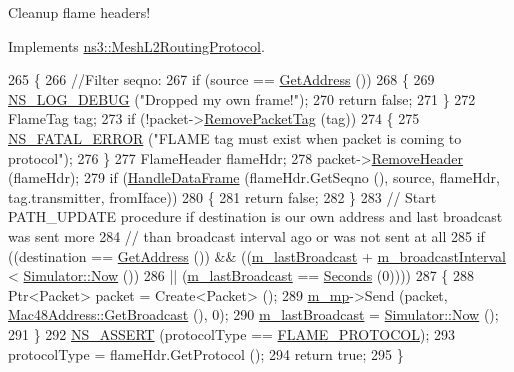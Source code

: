 Cleanup flame headers! 



Implements \hyperlink{classns3_1_1MeshL2RoutingProtocol_ae110ac0c9b8f81cb2a05940b385e7f08}{ns3\+::\+Mesh\+L2\+Routing\+Protocol}.


\begin{DoxyCode}
265 \{
266   \textcolor{comment}{//Filter seqno:}
267   \textcolor{keywordflow}{if} (source == \hyperlink{classns3_1_1flame_1_1FlameProtocol_a837bba2752ab7f2edfb4fc0488656c0a}{GetAddress} ())
268     \{
269       \hyperlink{group__logging_ga413f1886406d49f59a6a0a89b77b4d0a}{NS\_LOG\_DEBUG} (\textcolor{stringliteral}{"Dropped my own frame!"});
270       \textcolor{keywordflow}{return} \textcolor{keyword}{false};
271     \}
272   FlameTag tag;
273   \textcolor{keywordflow}{if} (!packet->\hyperlink{classns3_1_1Packet_a078fe922d976a417ab25ba2f3c2fd667}{RemovePacketTag} (tag))
274     \{
275       \hyperlink{group__fatal_ga5131d5e3f75d7d4cbfd706ac456fdc85}{NS\_FATAL\_ERROR} (\textcolor{stringliteral}{"FLAME tag must exist when packet is coming to protocol"});
276     \}
277   FlameHeader flameHdr;
278   packet->\hyperlink{classns3_1_1Packet_a0961eccf975d75f902d40956c93ba63e}{RemoveHeader} (flameHdr);
279   \textcolor{keywordflow}{if} (\hyperlink{classns3_1_1flame_1_1FlameProtocol_a72291eec881a8d8e1233695c0d382a52}{HandleDataFrame} (flameHdr.GetSeqno (), source, flameHdr, tag.transmitter, fromIface))
280     \{
281       \textcolor{keywordflow}{return} \textcolor{keyword}{false};
282     \}
283   \textcolor{comment}{// Start PATH\_UPDATE procedure if destination is our own address and last broadcast was sent more}
284   \textcolor{comment}{// than broadcast interval ago or was not sent at all}
285   \textcolor{keywordflow}{if} ((destination == \hyperlink{classns3_1_1flame_1_1FlameProtocol_a837bba2752ab7f2edfb4fc0488656c0a}{GetAddress} ()) && ((\hyperlink{classns3_1_1flame_1_1FlameProtocol_a9ea666e71f74654772318563e939df7f}{m\_lastBroadcast} + 
      \hyperlink{classns3_1_1flame_1_1FlameProtocol_a1c150d8b0802a20889fd125b804b24e2}{m\_broadcastInterval} < \hyperlink{classns3_1_1Simulator_ac3178fa975b419f7875e7105be122800}{Simulator::Now} ())
286                                          || (\hyperlink{classns3_1_1flame_1_1FlameProtocol_a9ea666e71f74654772318563e939df7f}{m\_lastBroadcast} == 
      \hyperlink{group__timecivil_ga33c34b816f8ff6628e33d5c8e9713b9e}{Seconds} (0))))
287     \{
288       Ptr<Packet> packet = Create<Packet> ();
289       \hyperlink{classns3_1_1MeshL2RoutingProtocol_af4ebb2340b72dfc607ddf3c1ae65b54a}{m\_mp}->Send (packet, \hyperlink{classns3_1_1Mac48Address_a55156e302c6bf950c0b558365adbde84}{Mac48Address::GetBroadcast} (), 0);
290       \hyperlink{classns3_1_1flame_1_1FlameProtocol_a9ea666e71f74654772318563e939df7f}{m\_lastBroadcast} = \hyperlink{classns3_1_1Simulator_ac3178fa975b419f7875e7105be122800}{Simulator::Now} ();
291     \}
292   \hyperlink{assert_8h_a6dccdb0de9b252f60088ce281c49d052}{NS\_ASSERT} (protocolType == \hyperlink{classns3_1_1flame_1_1FlameProtocol_a3d4799f4e6ee746e8e47cae132330c76}{FLAME\_PROTOCOL});
293   protocolType = flameHdr.GetProtocol ();
294   \textcolor{keywordflow}{return} \textcolor{keyword}{true};
295 \}
\end{DoxyCode}


